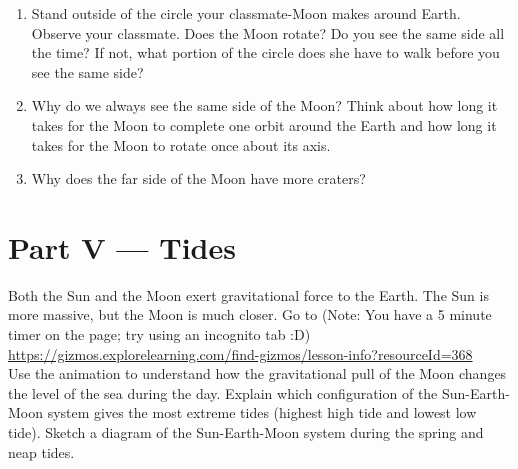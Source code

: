 \documentclass[10pt]{article}
\begin{document}
\begin{flushleft}
\begin{enumerate}
    \item Stand outside of the circle your classmate-Moon makes around Earth. Observe your classmate. Does the Moon rotate? Do you see the same side all the time? If not, what portion of the circle does she have to walk before you see the same side?
    \item Why do we always see the same side of the Moon? Think about how long it takes for the Moon to complete one orbit around the Earth and how long it takes for the Moon to rotate once about its axis.
    \item Why does the far side of the Moon have more craters?
\end{enumerate}


\section{Part V --- Tides}

Both the Sun and the Moon exert gravitational force to the Earth. The Sun is more massive, but the Moon is much closer. Go to (Note: You have a 5 minute timer on the page; try using an incognito tab :D) \\

\hspace{0.5in}\url{https://gizmos.explorelearning.com/find-gizmos/lesson-info?resourceId=368} \\

Use the animation to understand how the gravitational pull of the Moon changes the level of the sea during the day. Explain which configuration of the Sun-Earth-Moon system gives the most extreme tides (highest high tide and lowest low tide). Sketch a diagram of the Sun-Earth-Moon system during the spring and neap tides.








\end{flushleft}
\end{document}
